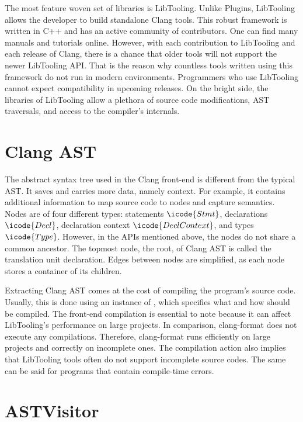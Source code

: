 The most feature woven set of libraries is LibTooling. 
Unlike Plugins, LibTooling allows the developer to build standalone 
Clang tools. 
This robust framework is written in C++ and has an active 
community of contributors. 
One can find many manuals and tutorials online. 
However, with each contribution to LibTooling and each release of Clang, 
there is a chance that older tools will not support the newer LibTooling 
API. 
That is the reason why countless tools written using this framework do not
run in modern environments. 
Programmers who use LibTooling cannot expect compatibility in upcoming 
releases. 
On the bright side, the libraries of LibTooling allow a plethora of source
code modifications, AST traversals, and access to the compiler's internals.

\section{Clang AST}


The abstract syntax tree used in the Clang front-end is different 
from the typical AST. 
It saves and carries more data, namely context.  
For example, it contains additional information to map source 
code to nodes and capture semantics.
Nodes are of four different types: statements \(\icode{Stmt}\), 
declarations \(\icode{Decl}\), declaration context \(\icode{DeclContext}\),
and types \(\icode{Type}\). 
However, in the APIs mentioned above, the nodes do not share
a common ancestor. 
The topmost node, the root, of Clang AST is called the translation
unit declaration. 
Edges between nodes are simplified, as each node stores 
a container of its children.

Extracting Clang AST comes at the cost of compiling the program's
source code. 
Usually, this is done using an instance of , 
which specifies what and how should be compiled. 
The front-end compilation is essential to note because it can affect 
LibTooling's performance on large projects. 
In comparison, clang-format does not execute any compilations. 
Therefore, clang-format runs efficiently on large projects 
and correctly on incomplete ones. 
The compilation action also implies that LibTooling tools often 
do not support incomplete source codes. 
The same can be said for programs that contain compile-time errors.

\section{ASTVisitor}


